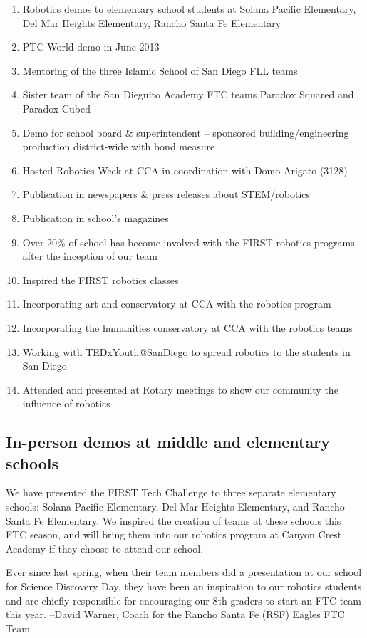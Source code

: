 \begin{enumerate}
	\item Robotics demos to elementary school students at Solana Pacific Elementary, Del Mar Heights Elementary, Rancho Santa Fe Elementary
	\item PTC World demo in June 2013
	\item Mentoring of the three Islamic School of San Diego FLL teams 
	\item Sister team of the San Dieguito Academy FTC teams Paradox Squared and Paradox Cubed
	\item Demo for school board \& superintendent – sponsored building/engineering production district-wide with bond measure
	\item Hosted Robotics Week at CCA in coordination with Domo Arigato (3128)
	\item Publication in newspapers \& press releases about STEM/robotics
	\item Publication in school's magazines
	\item Over 20\% of school has become involved with the FIRST robotics programs after the inception of our team
	\item Inspired the FIRST robotics classes
	\item Incorporating art and conservatory at CCA with the robotics program
	\item Incorporating the humanities conservatory at CCA with the robotics teams
	\item Working with TEDxYouth@SanDiego to spread robotics to the students in San Diego
	\item Attended and presented at Rotary meetings to show our community the influence of robotics
\end{enumerate}

\subsection{In-person demos at middle and elementary schools}

We have presented the FIRST Tech Challenge to three separate elementary schools: Solana Pacific Elementary, Del Mar Heights Elementary, and Rancho Santa Fe Elementary. We inspired the creation of teams at these schools this FTC season, and will bring them into our robotics program at Canyon Crest Academy if they choose to attend our school.

\begin{fancyquotes}
Ever since last spring, when their team members did a presentation at our school for Science Discovery Day, they have been an inspiration to our robotics students and are chiefly responsible for encouraging our 8th graders to start an FTC team this year. \newline \newline
--David Warner, Coach for the Rancho Santa Fe (RSF) Eagles FTC Team
\end{fancyquotes}

